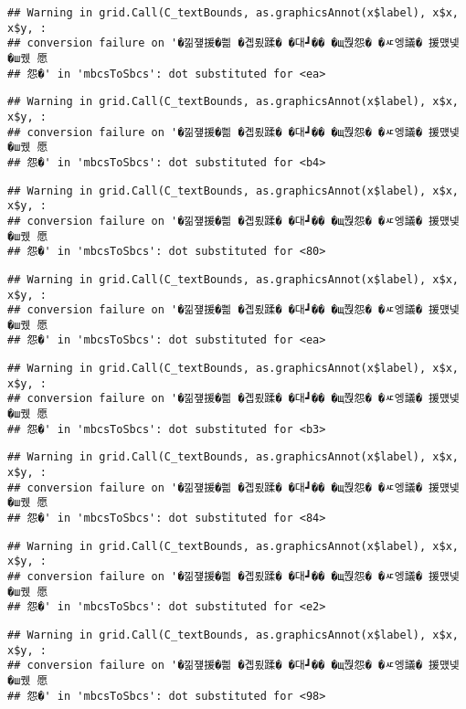 \documentclass[
]{article}
\begin{document}
\begin{verbatim}
## Warning in grid.Call(C_textBounds, as.graphicsAnnot(x$label), x$x, x$y, :
## conversion failure on '�낆쟾援�쁾 �곕룄蹂� �대┛�� �щ쭩怨� �ㅼ엥議� 援먰넻�ш퀬 愿
## 怨�' in 'mbcsToSbcs': dot substituted for <ea>
\end{verbatim}

\begin{verbatim}
## Warning in grid.Call(C_textBounds, as.graphicsAnnot(x$label), x$x, x$y, :
## conversion failure on '�낆쟾援�쁾 �곕룄蹂� �대┛�� �щ쭩怨� �ㅼ엥議� 援먰넻�ш퀬 愿
## 怨�' in 'mbcsToSbcs': dot substituted for <b4>
\end{verbatim}

\begin{verbatim}
## Warning in grid.Call(C_textBounds, as.graphicsAnnot(x$label), x$x, x$y, :
## conversion failure on '�낆쟾援�쁾 �곕룄蹂� �대┛�� �щ쭩怨� �ㅼ엥議� 援먰넻�ш퀬 愿
## 怨�' in 'mbcsToSbcs': dot substituted for <80>
\end{verbatim}

\begin{verbatim}
## Warning in grid.Call(C_textBounds, as.graphicsAnnot(x$label), x$x, x$y, :
## conversion failure on '�낆쟾援�쁾 �곕룄蹂� �대┛�� �щ쭩怨� �ㅼ엥議� 援먰넻�ш퀬 愿
## 怨�' in 'mbcsToSbcs': dot substituted for <ea>
\end{verbatim}

\begin{verbatim}
## Warning in grid.Call(C_textBounds, as.graphicsAnnot(x$label), x$x, x$y, :
## conversion failure on '�낆쟾援�쁾 �곕룄蹂� �대┛�� �щ쭩怨� �ㅼ엥議� 援먰넻�ш퀬 愿
## 怨�' in 'mbcsToSbcs': dot substituted for <b3>
\end{verbatim}

\begin{verbatim}
## Warning in grid.Call(C_textBounds, as.graphicsAnnot(x$label), x$x, x$y, :
## conversion failure on '�낆쟾援�쁾 �곕룄蹂� �대┛�� �щ쭩怨� �ㅼ엥議� 援먰넻�ш퀬 愿
## 怨�' in 'mbcsToSbcs': dot substituted for <84>
\end{verbatim}

\begin{verbatim}
## Warning in grid.Call(C_textBounds, as.graphicsAnnot(x$label), x$x, x$y, :
## conversion failure on '�낆쟾援�쁾 �곕룄蹂� �대┛�� �щ쭩怨� �ㅼ엥議� 援먰넻�ш퀬 愿
## 怨�' in 'mbcsToSbcs': dot substituted for <e2>
\end{verbatim}

\begin{verbatim}
## Warning in grid.Call(C_textBounds, as.graphicsAnnot(x$label), x$x, x$y, :
## conversion failure on '�낆쟾援�쁾 �곕룄蹂� �대┛�� �щ쭩怨� �ㅼ엥議� 援먰넻�ш퀬 愿
## 怨�' in 'mbcsToSbcs': dot substituted for <98>
\end{verbatim}
\end{document}

